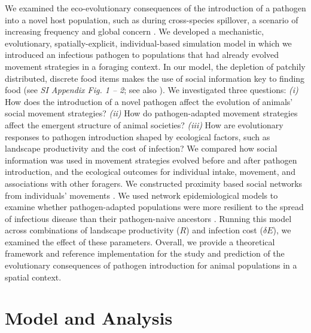 We examined the eco-evolutionary consequences of the introduction of a pathogen into a novel host population, such as during cross-species spillover, a scenario of increasing frequency and global concern \citep{blehert2009,globconsorth5n82016,fereidouni2019,scheele2019,sanderson2020,carlson2021,kuchipudi2022}.
We developed a mechanistic, evolutionary, spatially-explicit, individual-based simulation model in which we introduced an infectious pathogen to populations that had already evolved movement strategies in a foraging context.
In our model, the depletion of patchily distributed, discrete food items makes the use of social information key to finding food (see \textit{SI Appendix Fig. 1 -- 2}; see also \citealt{gupte2021a}).
We investigated three questions: \textit{(i)} How does the introduction of a novel pathogen affect the evolution of animals' social movement strategies?
\textit{(ii)} How do pathogen-adapted movement strategies affect the emergent structure of animal societies?
\textit{(iii)} How are evolutionary responses to pathogen introduction shaped by ecological factors, such as landscape productivity and the cost of infection?
We compared how social information was used in movement strategies evolved before and after pathogen introduction, and the ecological outcomes for individual intake, movement, and associations with other foragers.
We constructed proximity based social networks from individuals' movements \citep{whitehead2008,farine2015}.
We used network epidemiological models to examine whether pathogen-adapted populations were more resilient to the spread of infectious disease than their pathogen-naive ancestors \citep[][]{stroeymeyt2018}.
Running this model across combinations of landscape productivity ($R$) and infection cost ($\delta E$), we examined the effect of these parameters.
Overall, we provide a theoretical framework and reference implementation for the study and prediction of the evolutionary consequences of pathogen introduction for animal populations in a spatial context.

\section*{Model and Analysis}


